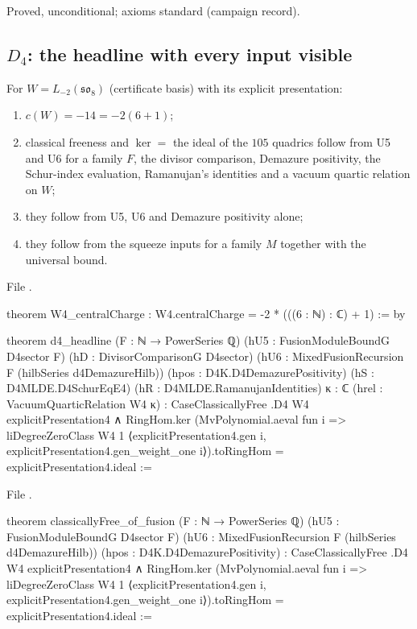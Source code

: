 \begin{status}
Proved, unconditional; axioms standard (campaign record).
\end{status}

\subsection{\texorpdfstring{$D_4$}{D4}: the headline with every input visible}

\begin{theorem}[$D_4$ headlines]\label{l27:thm:D4ladder}
For $W=L_{-2}(\mathfrak{so}_8)$ (certificate basis) with its explicit presentation:
\begin{enumerate}
\item[(a)] $c(W)=-14=-2(6+1)$;
\item[(b)] classical freeness and $\ker=$ the ideal of the $105$ quadrics follow from U5 and U6 for a family $F$, the divisor comparison,
  Demazure positivity, the Schur-index evaluation, Ramanujan's identities and a vacuum quartic relation on $W$;
\item[(c)] they follow from U5, U6 and Demazure positivity alone;
\item[(d)] they follow from the squeeze inputs for a family $M$ together with the universal bound.
\end{enumerate}
\end{theorem}
\noindent File .
\begin{leancode}
theorem W4_centralCharge : W4.centralCharge = -2 * (((6 : ℕ) : ℂ) + 1) := by
\end{leancode}
\begin{leancode}
theorem d4_headline (F : ℕ → PowerSeries ℚ) (hU5 : FusionModuleBoundG D4sector F)
    (hD : DivisorComparisonG D4sector) (hU6 : MixedFusionRecursion F (hilbSeries d4DemazureHilb))
    (hpos : D4K.D4DemazurePositivity) (hS : D4MLDE.D4SchurEqE4) (hR : D4MLDE.RamanujanIdentities)
    {κ : ℂ} (hrel : VacuumQuarticRelation W4 κ) :
    CaseClassicallyFree .D4 W4 explicitPresentation4 ∧
      RingHom.ker (MvPolynomial.aeval fun i =>
        liDegreeZeroClass W4 1 ⟨explicitPresentation4.gen i,
          explicitPresentation4.gen_weight_one i⟩).toRingHom = explicitPresentation4.ideal :=
\end{leancode}
\noindent File .
\begin{leancode}
theorem classicallyFree_of_fusion (F : ℕ → PowerSeries ℚ) (hU5 : FusionModuleBoundG D4sector F)
    (hU6 : MixedFusionRecursion F (hilbSeries d4DemazureHilb))
    (hpos : D4K.D4DemazurePositivity) :
    CaseClassicallyFree .D4 W4 explicitPresentation4 ∧
      RingHom.ker (MvPolynomial.aeval fun i =>
        liDegreeZeroClass W4 1 ⟨explicitPresentation4.gen i,
          explicitPresentation4.gen_weight_one i⟩).toRingHom = explicitPresentation4.ideal :=
\end{leancode}
